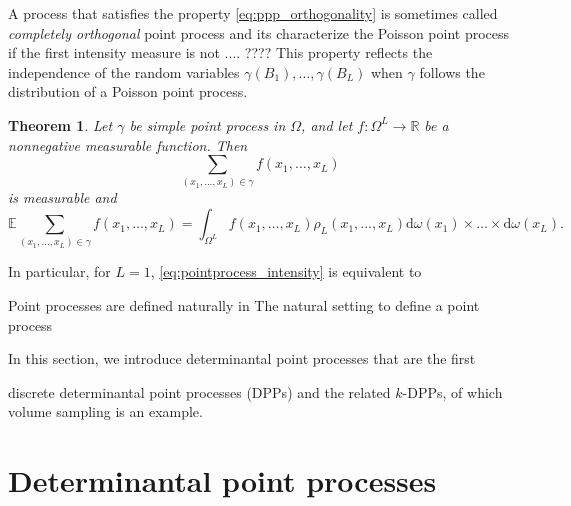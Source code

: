 \documentclass[twoside,11pt]{book}
\newtheorem{theorem}{Theorem}
\numberwithin{theorem}{chapter}
\numberwithin{definition}{chapter}
\numberwithin{proposition}{chapter}
\numberwithin{corollary}{chapter}
\numberwithin{example}{chapter}
\numberwithin{lemma}{chapter}
\begin{document}
A process that satisfies the property \eqref{eq:ppp_orthogonality} is sometimes called \emph{completely orthogonal} point process and its characterize the Poisson point process if the first intensity measure is not .... ???? This property reflects the independence of the random variables $\gamma(B_{1}), \dots, \gamma(B_L)$ when $\gamma$ follows the distribution of a Poisson point process. 



\begin{theorem}
Let $\gamma$ be simple point process in $\Omega$, and let $f: \Omega^{L} \rightarrow \mathbb{R}$ be a nonnegative measurable function. Then 
\begin{equation}
\sum\limits_{(x_{1}, \dots, x_{L}) \in \gamma} f(x_{1}, \dots, x_{L})
\end{equation}
is measurable and 
\begin{equation}
\mathbb{E}\sum\limits_{(x_{1}, \dots, x_{L}) \in \gamma} f(x_{1}, \dots, x_{L}) = \int_{\Omega^{L}} f(x_{1}, \dots, x_{L}) \rho_{L}(x_{1}, \dots, x_{L}) \mathrm{d}\omega(x_{1}) \times \dots \times \mathrm{d}\omega(x_{L}).
\end{equation}

\end{theorem}






In particular, for $ L = 1$, \eqref{eq:pointprocess_intensity} is equivalent to


Point processes are defined naturally in 
The natural setting to define a point process 

In this section, we introduce determinantal point processes that are the first 




 discrete determinantal point processes (DPPs) and the related $k$-DPPs, of which volume sampling is an example. 

\section{Determinantal point processes}\label{sec:dpp_defs}
\end{document}
